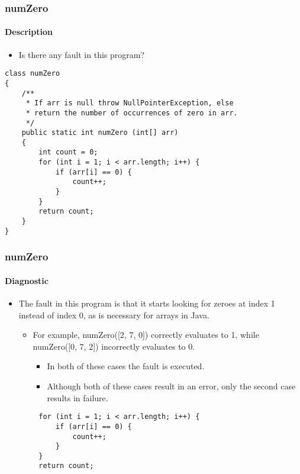 \begin{frame}[hasprev=false, hasnext=true, fragile]
\label{example:numzero}
\frametitle{numZero}
\framesubtitle{Description}

\begin{itemize}
	\item Is there any fault in this program?
\end{itemize}

\begin{lstlisting}
class numZero
{
    /**
     * If arr is null throw NullPointerException, else
     * return the number of occurrences of zero in arr.
     */
    public static int numZero (int[] arr)
    {
        int count = 0;
        for (int i = 1; i < arr.length; i++) {
            if (arr[i] == 0) {
                count++;
            }
        }
        return count;
    }
}
\end{lstlisting}
\end{frame}


\begin{frame}[hasprev=true, hasnext=true, fragile]
\frametitle{numZero}
\framesubtitle{Diagnostic}

\begin{itemize}
	\item The fault in this program is that it starts looking for zeroes at
	index 1 instead of index 0, as is necessary for arrays in Java.
	\begin{itemize}
		\item For example, numZero([2, 7, 0]) correctly evaluates to 1, while
		numZero([0, 7, 2]) incorrectly evaluates to 0.
		\begin{itemize}
			\item In both of these cases the fault is executed.

			\item Although both of these cases result in an error, only the
			second case results in failure.
		\end{itemize}
	 \end{itemize}
\end{itemize}

\begin{lstlisting}
        for (int i = 1; i < arr.length; i++) {
            if (arr[i] == 0) {
                count++;
            }
        }
        return count;
\end{lstlisting}
\end{frame}


